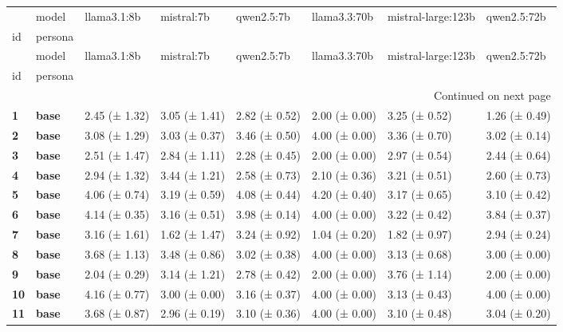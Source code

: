 \begin{longtable}{llllllll}
\toprule
 & model & llama3.1:8b & mistral:7b & qwen2.5:7b & llama3.3:70b & mistral-large:123b & qwen2.5:72b \\
id & persona &  &  &  &  &  &  \\
\midrule
\endfirsthead
\toprule
 & model & llama3.1:8b & mistral:7b & qwen2.5:7b & llama3.3:70b & mistral-large:123b & qwen2.5:72b \\
id & persona &  &  &  &  &  &  \\
\midrule
\endhead
\midrule
\multicolumn{8}{r}{Continued on next page} \\
\midrule
\endfoot
\bottomrule
\endlastfoot
\textbf{1} & \textbf{base} & 2.45 (± 1.32) & 3.05 (± 1.41) & 2.82 (± 0.52) & 2.00 (± 0.00) & 3.25 (± 0.52) & 1.26 (± 0.49) \\
\cline{1-8}
\textbf{2} & \textbf{base} & 3.08 (± 1.29) & 3.03 (± 0.37) & 3.46 (± 0.50) & 4.00 (± 0.00) & 3.36 (± 0.70) & 3.02 (± 0.14) \\
\cline{1-8}
\textbf{3} & \textbf{base} & 2.51 (± 1.47) & 2.84 (± 1.11) & 2.28 (± 0.45) & 2.00 (± 0.00) & 2.97 (± 0.54) & 2.44 (± 0.64) \\
\cline{1-8}
\textbf{4} & \textbf{base} & 2.94 (± 1.32) & 3.44 (± 1.21) & 2.58 (± 0.73) & 2.10 (± 0.36) & 3.21 (± 0.51) & 2.60 (± 0.73) \\
\cline{1-8}
\textbf{5} & \textbf{base} & 4.06 (± 0.74) & 3.19 (± 0.59) & 4.08 (± 0.44) & 4.20 (± 0.40) & 3.17 (± 0.65) & 3.10 (± 0.42) \\
\cline{1-8}
\textbf{6} & \textbf{base} & 4.14 (± 0.35) & 3.16 (± 0.51) & 3.98 (± 0.14) & 4.00 (± 0.00) & 3.22 (± 0.42) & 3.84 (± 0.37) \\
\cline{1-8}
\textbf{7} & \textbf{base} & 3.16 (± 1.61) & 1.62 (± 1.47) & 3.24 (± 0.92) & 1.04 (± 0.20) & 1.82 (± 0.97) & 2.94 (± 0.24) \\
\cline{1-8}
\textbf{8} & \textbf{base} & 3.68 (± 1.13) & 3.48 (± 0.86) & 3.02 (± 0.38) & 4.00 (± 0.00) & 3.13 (± 0.68) & 3.00 (± 0.00) \\
\cline{1-8}
\textbf{9} & \textbf{base} & 2.04 (± 0.29) & 3.14 (± 1.21) & 2.78 (± 0.42) & 2.00 (± 0.00) & 3.76 (± 1.14) & 2.00 (± 0.00) \\
\cline{1-8}
\textbf{10} & \textbf{base} & 4.16 (± 0.77) & 3.00 (± 0.00) & 3.16 (± 0.37) & 4.00 (± 0.00) & 3.13 (± 0.43) & 4.00 (± 0.00) \\
\cline{1-8}
\textbf{11} & \textbf{base} & 3.68 (± 0.87) & 2.96 (± 0.19) & 3.10 (± 0.36) & 4.00 (± 0.00) & 3.10 (± 0.48) & 3.04 (± 0.20) \\

\end{longtable}
